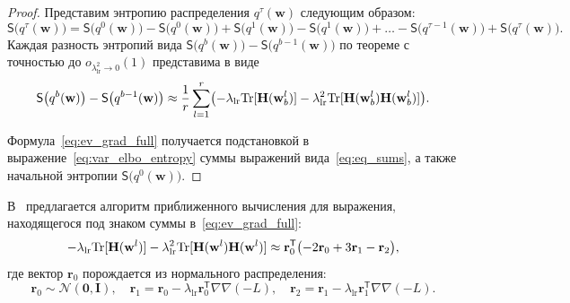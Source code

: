 \begin{proof} Представим энтропию распределения $q^\tau(\mathbf{w})$ следующим образом:
\[
\mathsf{S}\bigl(q^\tau(\mathbf{w})\bigr) = \mathsf{S}\bigl(q^0(\mathbf{w})\bigr) - \mathsf{S}\bigl(q^0(\mathbf{w})\bigr) + \mathsf{S}\bigl(q^1(\mathbf{w})\bigr) - \mathsf{S}\bigl(q^1(\mathbf{w})\bigr) +\dots -
\mathsf{S}\bigl(q^{\tau-1}(\mathbf{w})\bigr) + \mathsf{S}\bigl(q^\tau(\mathbf{w})\bigr).
\]
Каждая разность энтропий вида $\mathsf{S}\bigl(q^b(\mathbf{w})\bigr) - \mathsf{S}\bigl(q^{b-1}(\mathbf{w})\bigr)$ по теореме с точностью до $o_{\lambda_{\text{lr}}^2 \to 0}(1)$ представима в виде
\begin{equation}
\label{eq:eq_sums}
	\mathsf{S}\bigl(q^b(\mathbf{w})\bigr) -  \mathsf{S}\bigl(q^{b-1}(\mathbf{w})\bigr)  \approx  \frac{1}{r}\sum_{l=1}^r \bigl(-\lambda_{\text{lr}} \textnormal{Tr}[\mathbf{H}(\mathbf{w}_b^l)] - \lambda_{\text{lr}}^2 \textnormal{Tr}[\mathbf{H}(\mathbf{w}_b^l)\mathbf{H}(\mathbf{w}_b^l)]  \bigr).
\end{equation}

Формула~\eqref{eq:ev_grad_full} получается подстановкой в выражение~\eqref{eq:var_elbo_entropy} суммы выражений вида~\eqref{eq:eq_sums}, а также начальной энтропии $\mathsf{S}\bigl(q^0(\mathbf{w}))$.
\end{proof}

В~\cite{early} предлагается алгоритм приближенного вычисления для выражения, находящегося под знаком суммы в~\eqref{eq:ev_grad_full}:
\[
	-\lambda_{\text{lr}} \textnormal{Tr}[\mathbf{H}(\mathbf{w}^l)] - \lambda_{\text{lr}}^2 \textnormal{Tr}[\mathbf{H}(\mathbf{w}^l)\mathbf{H}(\mathbf{w}^l)]  \approx \mathbf{r}_0^\mathsf{T}\bigl(-2\mathbf{r}_0 + 3\mathbf{r}_1 -\mathbf{r}_2\bigr),
\]
где вектор $\mathbf{r}_0$  порождается из нормального распределения:
$$\mathbf{r}_0 \sim \mathcal{N}(\mathbf{0}, \mathbf{I}), \quad \mathbf{r}_1 = \mathbf{r}_0 - \lambda_{\text{lr}} \mathbf{r}_0^\mathsf{T} \nabla \nabla (-L), \quad \mathbf{r}_2 = \mathbf{r}_1 - \lambda_{\text{lr}} \mathbf{r}_1^\mathsf{T} \nabla \nabla (-L).$$


